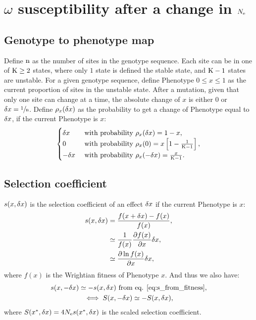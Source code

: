 \section{\texorpdfstring{$\omega$}{ω} susceptibility after a change in \texorpdfstring{$N_{\mathrm{e}}$}{Nₑ}}
\subsection{Genotype to {phenotype} map}
Define $\text{n}$ as the number of sites in the genotype sequence.
Each site can be in one of $\text{K} \geq 2$ states, where only $1$ state is defined the stable state, and $\text{K} - 1$ states are unstable.
For a given genotype sequence, define \gls{Phenotype} $0 \leq x \leq 1$ as the current proportion of sites in the unstable state.
After a mutation, given that only one site can change at a time, the absolute change of $x$ is either $0$ or $\delta x=\sfrac{1}{\text{n}}$.
Define $\rho_{x}(\delta x)$ as the probability to get a change of \gls{Phenotype} equal to $\delta x$, if the current \gls{Phenotype} is $x$:\\
\begin{gather}
\begin{cases}
\delta x &\text{ with probability } \rho_{x}(\delta x) = 1-x, \\
0 &\text{ with probability } \rho_{x}(0) = x \left[1 - \frac{1}{\text{K} - 1}\right], \\
-\delta x &\text{ with probability } \rho_{x}(-\delta x) = \frac{x}{\text{K} - 1}.\\
\end{cases} \label{eq:proba-pheno}
\end{gather}
\subsection{Selection coefficient}
$s(x, \delta x)$ is the selection coefficient of an effect $\delta x$ if the current \gls{Phenotype} is $x$:
\begin{align}
s(x, \delta x) &= \frac{f(x + \delta x) - f(x)}{f( x)}, \\
 &\simeq \frac{1}{f(x)}\frac{ \partial f(x) }{\partial x} \delta x, \\
 &\simeq \frac{ \partial \ln f(x) }{\partial x} \delta x, \label{eq:s_from_fitness}
\end{align}
where $f( x)$ is the Wrightian fitness of \gls{Phenotype} $x$. And thus we also have:
\begin{gather}
s(x, -\delta x) \simeq - s(x, \delta x) \text{ from eq. \ref{eq:s_from_fitness}} \label{eq:s_minus_deltax}, \\
\iff S(x, -\delta x) \simeq - S(x, \delta x), \label{eq:S_minus_deltax}
\end{gather}
where $S(x^{*}, \delta x) = 4N_{\mathrm{e}} s (x^{*}, \delta x)$ is the scaled selection coefficient.
